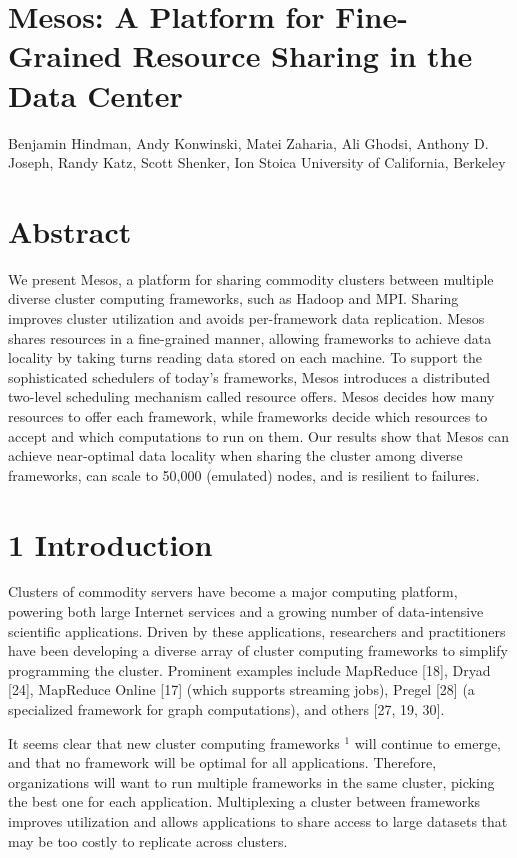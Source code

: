 \documentclass[
]{article}
\author{}
\date{}
\begin{document}
\section{Mesos: A Platform for Fine-Grained Resource Sharing in the Data
Center}\label{mesos-a-platform-for-fine-grained-resource-sharing-in-the-data-center}

Benjamin Hindman, Andy Konwinski, Matei Zaharia, Ali Ghodsi, Anthony D.
Joseph, Randy Katz, Scott Shenker, Ion Stoica University of California,
Berkeley

\section{Abstract}\label{abstract}

We present Mesos, a platform for sharing commodity clusters between
multiple diverse cluster computing frameworks, such as Hadoop and MPI.
Sharing improves cluster utilization and avoids per-framework data
replication. Mesos shares resources in a fine-grained manner, allowing
frameworks to achieve data locality by taking turns reading data stored
on each machine. To support the sophisticated schedulers of today's
frameworks, Mesos introduces a distributed two-level scheduling
mechanism called resource offers. Mesos decides how many resources to
offer each framework, while frameworks decide which resources to accept
and which computations to run on them. Our results show that Mesos can
achieve near-optimal data locality when sharing the cluster among
diverse frameworks, can scale to 50,000 (emulated) nodes, and is
resilient to failures.

\section{1 Introduction}\label{introduction}

Clusters of commodity servers have become a major computing platform,
powering both large Internet services and a growing number of
data-intensive scientific applications. Driven by these applications,
researchers and practitioners have been developing a diverse array of
cluster computing frameworks to simplify programming the cluster.
Prominent examples include MapReduce {[}18{]}, Dryad {[}24{]}, MapReduce
Online {[}17{]} (which supports streaming jobs), Pregel {[}28{]} (a
specialized framework for graph computations), and others {[}27, 19,
30{]}.

It seems clear that new cluster computing frameworks \(^{1}\) will
continue to emerge, and that no framework will be optimal for all
applications. Therefore, organizations will want to run multiple
frameworks in the same cluster, picking the best one for each
application. Multiplexing a cluster between frameworks improves
utilization and allows applications to share access to large datasets
that may be too costly to replicate across clusters.
\end{document}
